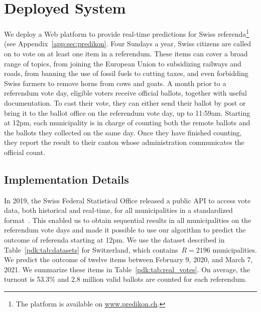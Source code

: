 \section{Deployed System}%
\label{pdk:sec:depsys}

We deploy a Web platform to provide real-time predictions for Swiss referenda\footnote{The platform is available on \href{http://www.predikon.ch}{www.predikon.ch}.} (see Appendix~\ref{app:sec:predikon}.
Four Sundays a year, Swiss citizens are called on to vote on at least one item in a referendum.
These items can cover a broad range of topics, from joining the European Union to subsidizing railways and roads, from banning the use of fossil fuels to cutting taxes, and even forbidding Swiss farmers to remove horns from cows and goats.
A month prior to a referendum vote day, eligible voters receive official ballots, together with useful documentation.
To cast their vote, they can either send their ballot by post or bring it to the ballot office on the referendum vote day, up to 11:59am.
Starting at 12pm, each municipality is in charge of counting both the remote ballots and the ballots they collected on the same day.
Once they have finished counting, they report the result to their canton whose administration communicates the official count.

\subsection{Implementation Details}

In 2019, the Swiss Federal Statistical Office released a public API to access vote data, both historical and real-time, for all municipalities in a standardized format~\cite{confederation2020open}.
This enabled us to obtain sequential results in all municipalities on the referendum vote days and made it possible to use our algorithm to predict the outcome of referenda starting at 12pm.
We use the dataset described in Table~\ref{pdk:tab:datasets} for Switzerland, which contains~$R = 2196$ municipalities.
We predict the outcome of twelve items between February 9, 2020, and March 7, 2021.
We summarize these items in Table~\ref{pdk:tab:real_votes}.
On average, the turnout is 53.3\% and 2.8 million valid ballots are counted for each referendum.


